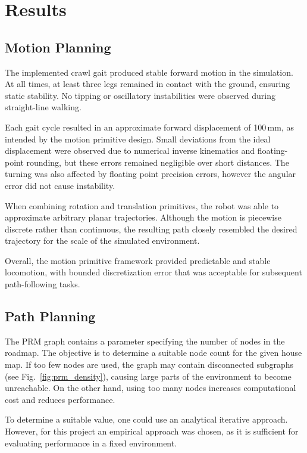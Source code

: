 \documentclass[a4paper,12pt]{article}
\begin{document}
\section{Results}

\subsection{Motion Planning}
The implemented crawl gait produced stable forward motion in the
simulation. At all times, at least three legs remained in contact with
the ground, ensuring static stability. No tipping or oscillatory
instabilities were observed during straight-line walking.

Each gait cycle resulted in an approximate forward displacement of
100\,mm, as intended by the motion primitive design. Small deviations
from the ideal displacement were observed due to numerical inverse
kinematics and floating-point rounding, but these errors remained
negligible over short distances. The turning was also affected by
floating point precision errors, however the angular error did not cause instability.

When combining rotation and translation primitives, the robot was able
to approximate arbitrary planar trajectories. Although the motion is
piecewise discrete rather than continuous, the resulting path closely
resembled the desired trajectory for the scale of the simulated
environment.

Overall, the motion primitive framework provided predictable and stable
locomotion, with bounded discretization error that was acceptable for
subsequent path-following tasks.


\subsection{Path Planning}

The PRM graph contains a parameter specifying the number of nodes in the
roadmap. The objective is to determine a suitable node count for the given
house map. If too few nodes are used, the graph may contain disconnected
subgraphs (see Fig.~\ref{fig:prm_density}), causing large parts of the
environment to become unreachable. On the other hand, using too many nodes
increases computational cost and reduces performance.

To determine a suitable value, one could use an analytical iterative
approach. However, for this project an empirical approach was chosen,
as it is sufficient for evaluating performance in a fixed environment.
\end{document}
